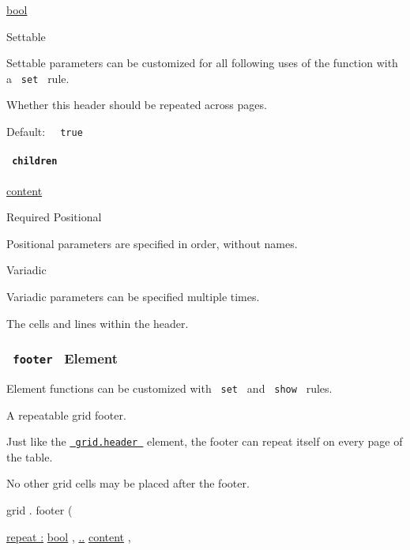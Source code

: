 \href{/docs/reference/foundations/bool/}{bool}

{{ Settable }}

\label{definitions-header-repeat-settable-tooltip}
Settable parameters can be customized for all following uses of the
function with a \texttt{\ set\ } rule.

Whether this header should be repeated across pages.

Default: \texttt{\ }{\texttt{\ true\ }}\texttt{\ }

\paragraph{\texorpdfstring{\texttt{\ children\ }}{ children }}\label{definitions-header-children}

\href{/docs/reference/foundations/content/}{content}

{Required} {{ Positional }}

\label{definitions-header-children-positional-tooltip}
Positional parameters are specified in order, without names.

{{ Variadic }}

\label{definitions-header-children-variadic-tooltip}
Variadic parameters can be specified multiple times.

The cells and lines within the header.

\subsubsection{\texorpdfstring{\texttt{\ footer\ } {{ Element
}}}{ footer   Element }}\label{definitions-footer}

\label{definitions-footer-element-tooltip}
Element functions can be customized with \texttt{\ set\ } and
\texttt{\ show\ } rules.

A repeatable grid footer.

Just like the
\href{/docs/reference/layout/grid/\#definitions-header}{\texttt{\ grid.header\ }}
element, the footer can repeat itself on every page of the table.

No other grid cells may be placed after the footer.

grid { . } { footer } (

{ \hyperref[definitions-footer-parameters-repeat]{repeat :}
\href{/docs/reference/foundations/bool/}{bool} , } {
\hyperref[definitions-footer-parameters-children]{..}
\href{/docs/reference/foundations/content/}{content} , }


